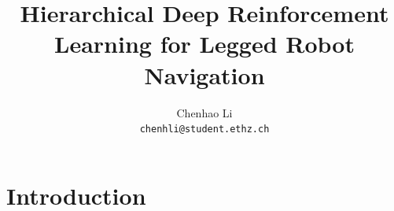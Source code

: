 \documentclass{article}
\title{Hierarchical Deep Reinforcement Learning for Legged Robot Navigation}
\author{
    Chenhao Li \\
    \texttt{chenhli@student.ethz.ch} \\
}
\begin{document}
\maketitle


\section{Introduction}




\end{document}
